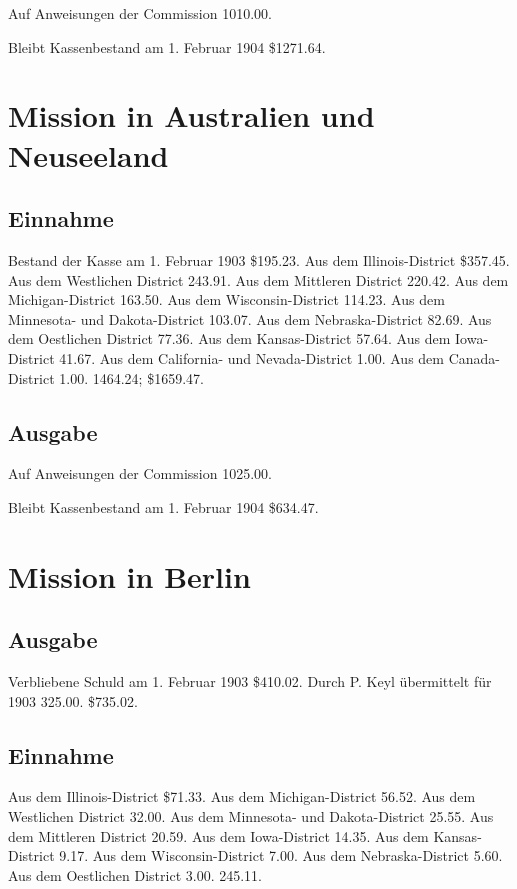 Auf Anweisungen der Commission 1010.00.

Bleibt Kassenbestand am 1. Februar 1904 \$1271.64.

\section{Mission in Australien und Neuseeland}

\subsection{Einnahme}

Bestand der Kasse am 1. Februar 1903 \$195.23. Aus dem Illinois-District \$357.45. Aus dem Westlichen District 243.91. Aus dem Mittleren District 220.42. Aus dem Michigan-District 163.50. Aus dem Wisconsin-District 114.23. Aus dem Minnesota- und Dakota-District 103.07. Aus dem Nebraska-District 82.69. Aus dem Oestlichen District 77.36. Aus dem Kansas-District 57.64. Aus dem Iowa-District 41.67. Aus dem California- und Nevada-District 1.00. Aus dem Canada-District 1.00. 1464.24; \$1659.47.

\subsection{Ausgabe}

Auf Anweisungen der Commission 1025.00.

Bleibt Kassenbestand am 1. Februar 1904 \$634.47.

\section{Mission in Berlin}

\subsection{Ausgabe}

Verbliebene Schuld am 1. Februar 1903 \$410.02. Durch P. Keyl übermittelt für 1903 325.00. \$735.02.

\subsection{Einnahme}

Aus dem Illinois-District \$71.33. Aus dem Michigan-District 56.52. Aus dem Westlichen District 32.00. Aus dem Minnesota- und Dakota-District 25.55. Aus dem Mittleren District 20.59. Aus dem Iowa-District 14.35. Aus dem Kansas-District 9.17. Aus dem Wisconsin-District 7.00. Aus dem Nebraska-District 5.60. Aus dem Oestlichen District 3.00. 245.11.

